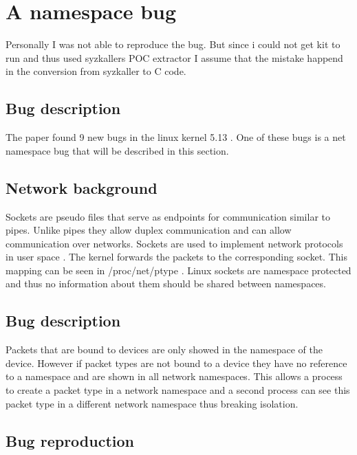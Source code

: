 \documentclass[10pt,twocolumn,a4paper]{article}
\begin{document}
\section{A namespace bug}\label{sec:bug}
Personally I was not able to reproduce the bug. But
since i could not get kit to run and thus used syzkallers POC extractor I assume that the mistake
happend in the conversion from syzkaller to C code\cite{0}.
\subsection{Bug description}
The paper found 9 new bugs in the linux kernel 5.13 \cite{0}. One of these bugs is a net namespace
bug that will be described in this section. 
\subsection{Network background}
Sockets are pseudo files that serve as endpoints for communication similar to pipes. Unlike pipes
they allow duplex communication and can allow communication over networks\cite{5}. Sockets are
used to implement network protocols in user space \cite{5}. The kernel forwards the packets to the
corresponding socket. This mapping can be seen in /proc/net/ptype \cite{6}. Linux sockets are
namespace protected and thus no information about them should be shared between namespaces.

\subsection{Bug description}
Packets that are bound to devices are only showed in the namespace of the device. However if packet
types are not bound to a device they have no reference to a namespace and are shown in all network
namespaces. This allows a process to create a packet type in a network namespace and a second
process can see this packet type in a different network namespace thus breaking isolation.


\subsection{Bug reproduction}
\end{document}
